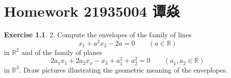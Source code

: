 \documentclass[a4paper]{book}
\makeatletter
\newcommand{\voidenvironment}[1]{%
  \expandafter\providecommand\csname env@#1@save@env\endcsname{}%
  \expandafter\providecommand\csname env@#1@process\endcsname{}%
  \@ifundefined{#1}{}{\RenewEnviron{#1}{}}%
}
\numberwithin{equation}{chapter}
\theoremstyle{definition}
\newtheorem{exc}[exm]{Exercise}
\makeatother
\begin{document}
\pagestyle{empty}
% 



\setcounter{chapter}{5}




\chapter{Homework 21935004 谭焱}



\begin{exc}
  2.  Compute the envelopes of the family of lines
  \begin{equation}
    \label{eq:6:1:1}
    x_1 + a^2 x_2 - 2a = 0 \qquad (a \in \mathbb{R})
  \end{equation}
  in $\mathbb{R}^2$ and of the family of planes
  \begin{equation}
    \label{eq:6:1:2}
    2 a_1 x_1 + 2 a_2 x_x - x_3 + a_1^2 + a_2^2 = 0 \qquad (a_1, a_2 \in \mathbb{R})
  \end{equation}
  in $\mathbb{R}^3$. Draw pictures illustrating the geometric meaning of the enveplopes.
\end{exc}
\end{document}
